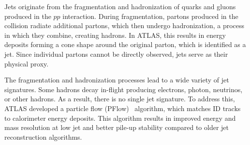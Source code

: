 Jets originate from the fragmentation and hadronization of quarks and gluons produced in the $pp$ interaction. During fragmentation, partons produced in the collision radiate additional partons, which then undergo hadronization, a process in which they combine, creating hadrons. In ATLAS, this results in energy deposits forming a cone shape around the original parton, which is identified as a jet. Since individual partons cannot be directly observed, jets serve as their physical proxy.

The fragmentation and hadronization processes lead to a wide variety of jet signatures. Some hadrons decay in-flight producing electrons, photon, neutrinos, or other hadrons. As a result, there is no single jet signature. To address this, ATLAS developed a particle flow (PFlow)~\cite{ATLAS:2017ghe} algorithm, which matches ID tracks to calorimeter energy deposits. This algorithm results in improved energy and mass resolution at low jet \pt{} and better pile-up stability compared to older jet reconstruction algorithms.~\cite{ATL-PHYS-PUB-2022-038}